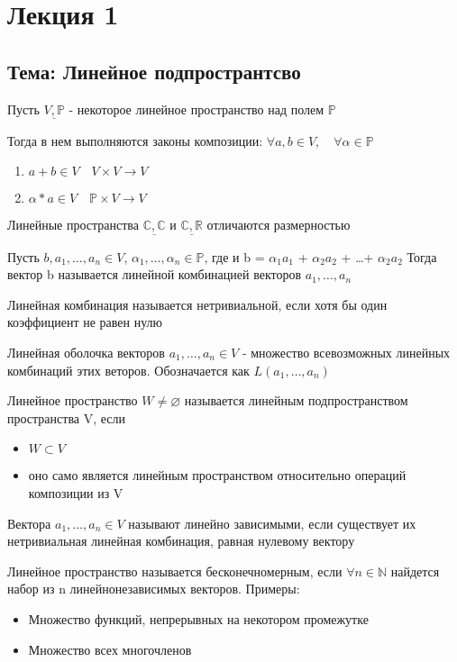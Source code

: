 \documentclass[l1pt]{article}
\begin{document}
\section*{Лекция 1}
\date{May 2017}
\subsection*{Тема: Линейное подпространтсво}
\begin{flushleft}
Пусть $\underline{V,  \mathbb{P}}$ - некоторое линейное пространство над полем $\mathbb{P}$

Тогда в нем выполняются законы композиции:
$\forall a, b \in V, \quad \forall \alpha \in \mathbb{P}$
\begin{enumerate}
 \item $a + b \in V \quad V \times V \rightarrow V$
 \item $\alpha * a \in V \quad \mathbb{P} \times V \rightarrow V$
\end{enumerate}


Линейные пространства $\underline{\mathbb{C}, \mathbb{C}}$ и $\underline{\mathbb{C}, \mathbb{R}}$ отличаются размерностью\newline

Пусть $b, a_1, \dots , a_n \in V$, $\alpha_1, \dots , \alpha_n \in \mathbb{P}$, где и b = $\alpha_1 a_1$ + $\alpha_2 a_2$ + \dots + $\alpha_2 a_2$
Тогда вектор b называется линейной комбинацией векторов $a_1, \dots , a_n$\newline

Линейная комбинация называется нетривиальной, если хотя бы один коэффициент не равен нулю

Линейная оболочка векторов $a_1, \dots , a_n \in V$ - множество всевозможных линейных комбинаций этих веторов. Обозначается как $L(a_1, \dots , a_n)$

Линейное пространство $W \neq \varnothing$ называется линейным подпространством пространства V, если
\begin{itemize}
 \item $W \subset V$
 \item оно само является линейным пространством относительно операций композиции из V 
\end{itemize}

Вектора $a_1, \dots , a_n \in V$ называют линейно зависимыми, если существует их нетривиальная линейная комбинация, равная нулевому вектору\newline

Линейное пространство называется бесконечномерным, если $\forall n \in \mathbb{N}$ найдется набор из n линейнонезависимых векторов. 
Примеры:
\begin{itemize}
 \item Множество функций, непрерывных на некотором промежутке
 \item Множество всех многочленов 
\end{itemize}


\end{flushleft}
\end{document}
